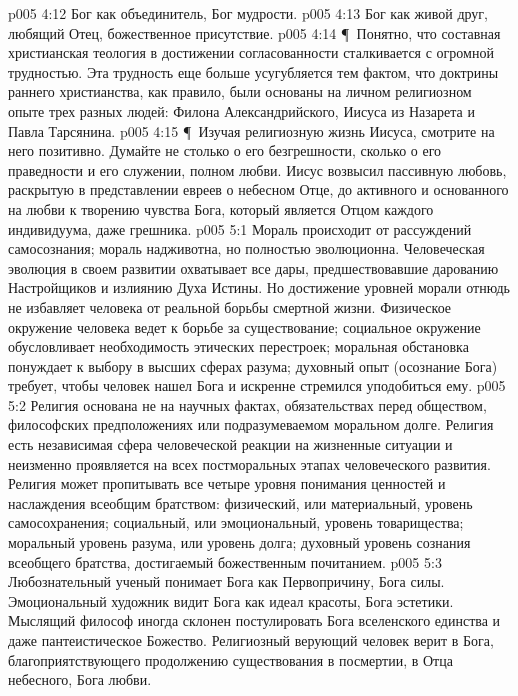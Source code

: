 \vs p005 4:12 \bibnobreakspace {} Бог как объединитель, Бог мудрости.
\vs p005 4:13 \bibnobreakspace {} Бог как живой друг, любящий Отец, божественное присутствие.
\vs p005 4:14 \P\ Понятно, что составная христианская теология в достижении согласованности сталкивается с огромной трудностью. Эта трудность еще больше усугубляется тем фактом, что доктрины раннего христианства, как правило, были основаны на личном религиозном опыте трех разных людей: Филона Александрийского, Иисуса из Назарета и Павла Тарсянина.
\vs p005 4:15 \P\ Изучая религиозную жизнь Иисуса, смотрите на него позитивно. Думайте не столько о его безгрешности, сколько о его праведности и его служении, полном любви. Иисус возвысил пассивную любовь, раскрытую в представлении евреев о небесном Отце, до  активного и основанного на любви к творению чувства Бога, который является Отцом каждого индивидуума, даже грешника.
\vs p005 5:1 Мораль происходит от рассуждений самосознания; мораль надживотна, но полностью эволюционна. Человеческая эволюция в своем развитии охватывает все дары, предшествовавшие дарованию Настройщиков и излиянию Духа Истины. Но достижение уровней морали отнюдь не избавляет человека от реальной борьбы смертной жизни. Физическое окружение человека ведет к борьбе за существование; социальное окружение обусловливает необходимость этических перестроек; моральная обстановка понуждает к выбору в высших сферах разума; духовный опыт (осознание Бога) требует, чтобы человек нашел Бога и искренне стремился уподобиться ему.
\vs p005 5:2 Религия основана не на научных фактах, обязательствах перед обществом, философских предположениях или подразумеваемом моральном долге. Религия есть независимая сфера человеческой реакции на жизненные ситуации и неизменно проявляется на всех постморальных этапах человеческого развития. Религия может пропитывать все четыре уровня понимания ценностей и наслаждения всеобщим братством: физический, или материальный, уровень самосохранения; социальный, или эмоциональный, уровень товарищества; моральный уровень разума, или уровень долга; духовный уровень сознания всеобщего братства, достигаемый божественным почитанием.
\vs p005 5:3 Любознательный ученый понимает Бога как Первопричину, Бога силы. Эмоциональный художник видит Бога как идеал красоты, Бога эстетики. Мыслящий философ иногда склонен постулировать Бога вселенского единства и даже пантеистическое Божество. Религиозный верующий человек верит в Бога, благоприятствующего продолжению существования в посмертии, в Отца небесного, Бога любви.
